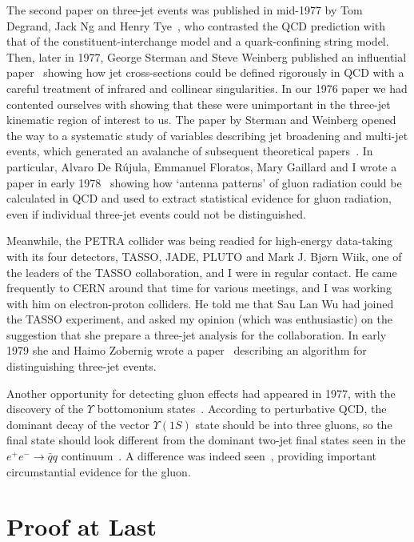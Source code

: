 \documentclass[12pt]{article} %
\begin{document}
The second paper on three-jet events was published in mid-1977 by Tom Degrand, Jack Ng and Henry Tye~\cite{DNT},
who contrasted the QCD prediction with that of the constituent-interchange model and a quark-confining
string model. Then, later in 1977, George Sterman and Steve Weinberg published an influential paper~\cite{SW}
showing how jet cross-sections could be defined rigorously in QCD with a careful treatment of infrared and 
collinear singularities. In our 1976 paper we had contented ourselves with showing that these were 
unimportant in the three-jet kinematic region of interest to us. The paper by Sterman and Weinberg
opened the way to a systematic study of variables describing jet broadening and multi-jet events, 
which generated an avalanche of subsequent theoretical papers~\cite{SphT}. In particular, Alvaro De R{\'u}jula, 
Emmanuel Floratos, Mary Gaillard and I wrote a paper in early 1978~\cite{DEFG} showing how `antenna patterns' of gluon radiation 
could be calculated in QCD and used to extract statistical evidence for gluon radiation, 
even if individual three-jet events could not be distinguished.

Meanwhile, the PETRA collider was being readied for high-energy data-taking with its four detectors, 
TASSO, JADE, PLUTO and Mark J. Bj{\o}rn Wiik, one of the leaders of the TASSO collaboration, and I
were in regular contact. He came frequently to CERN around that time for various meetings,
and I was working with him on electron-proton colliders. He told me that Sau Lan Wu had joined the
TASSO experiment, and asked my opinion (which was enthusiastic) on the suggestion
that she prepare a three-jet analysis for the collaboration. In early 1979 she and Haimo Zobernig
wrote a paper~\cite{WZ} describing an algorithm for distinguishing three-jet events.

Another opportunity for detecting gluon effects had appeared in 1977, with the discovery of the $\Upsilon$
bottomonium states~\cite{Ups}. According to perturbative QCD, the dominant decay of the vector $\Upsilon(1S)$ state
should be into three gluons, so the final state should look different from the dominant two-jet final states
seen in the $e^+ e^- \to {\bar q}q$ continuum~\cite{Ups3}. A difference was indeed seen~\cite{PLUTO}, providing important
circumstantial evidence for the gluon.

\section{Proof at Last}
\end{document}
